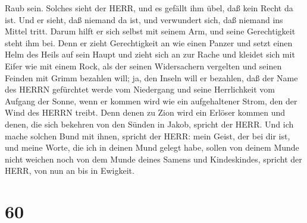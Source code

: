 Raub sein. Solches sieht der HERR, und es gefällt ihm übel, daß kein
Recht da ist.  Und er sieht, daß niemand da ist, und
verwundert sich, daß niemand ins Mittel tritt. Darum hilft er sich
selbst mit seinem Arm, und seine Gerechtigkeit steht ihm bei.
 Denn er zieht Gerechtigkeit an wie einen Panzer und setzt
einen Helm des Heils auf sein Haupt und zieht sich an zur Rache und
kleidet sich mit Eifer wie mit einem Rock,  als der seinen
Widersachern vergelten und seinen Feinden mit Grimm bezahlen will; ja,
den Inseln will er bezahlen,  daß der Name des HERRN
gefürchtet werde vom Niedergang und seine Herrlichkeit vom Aufgang der
Sonne, wenn er kommen wird wie ein aufgehaltener Strom, den der Wind des
HERRN treibt.  Denn denen zu Zion wird ein Erlöser kommen
und denen, die sich bekehren von den Sünden in Jakob, spricht der HERR.
 Und ich mache solchen Bund mit ihnen, spricht der HERR:
mein Geist, der bei dir ist, und meine Worte, die ich in deinen Mund
gelegt habe, sollen von deinem Munde nicht weichen noch von dem Munde
deines Samens und Kindeskindes, spricht der HERR, von nun an bis in
Ewigkeit.

\hypertarget{section-59}{%
\section{60}\label{section-59}}

